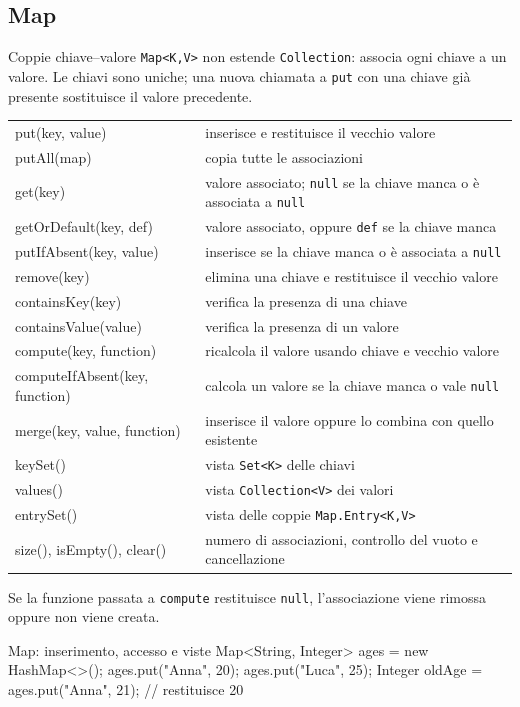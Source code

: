 ﻿\documentclass[10pt,a4paper]{article}
\newcommand{\cmd}[1]{\texttt{#1}}
\newcommand{\topicsubsection}[1]{\Needspace{10\baselineskip}\subsection{#1}}
\newenvironment{topicblock}{%
  \par\medskip\noindent\begin{minipage}{\textwidth}%
}{%
  \end{minipage}\par\medskip%
}
\begin{document}
\begin{topicblock}
\topicsubsection{Map}
\begin{concept}{Coppie chiave--valore}
\cmd{Map<K,V>} non estende \cmd{Collection}: associa ogni chiave a un valore.
Le chiavi sono uniche; una nuova chiamata a \cmd{put} con una chiave già
presente sostituisce il valore precedente.

\begin{tabularx}{\textwidth}{>{\ttfamily\small}p{5.5cm} X}
put(key, value) & inserisce e restituisce il vecchio valore \\
putAll(map) & copia tutte le associazioni \\
get(key) & valore associato; \cmd{null} se la chiave manca o è associata a \cmd{null} \\
getOrDefault(key, def) & valore associato, oppure \cmd{def} se la chiave manca \\
putIfAbsent(key, value) & inserisce se la chiave manca o è associata a \cmd{null} \\
remove(key) & elimina una chiave e restituisce il vecchio valore \\
containsKey(key) & verifica la presenza di una chiave \\
containsValue(value) & verifica la presenza di un valore \\
compute(key, function) & ricalcola il valore usando chiave e vecchio valore \\
computeIfAbsent(key, function) & calcola un valore se la chiave manca o vale \cmd{null} \\
merge(key, value, function) & inserisce il valore oppure lo combina con quello esistente \\
keySet() & vista \cmd{Set<K>} delle chiavi \\
values() & vista \cmd{Collection<V>} dei valori \\
entrySet() & vista delle coppie \cmd{Map.Entry<K,V>} \\
size(), isEmpty(), clear() & numero di associazioni, controllo del vuoto e cancellazione \\
\end{tabularx}

Se la funzione passata a \cmd{compute} restituisce \cmd{null},
l'associazione viene rimossa oppure non viene creata.
\end{concept}

\begin{codebox}{Map: inserimento, accesso e viste}
Map<String, Integer> ages = new HashMap<>();
ages.put("Anna", 20);
ages.put("Luca", 25);
Integer oldAge = ages.put("Anna", 21); // restituisce 20


\end{codebox}
\end{topicblock}
\end{document}
